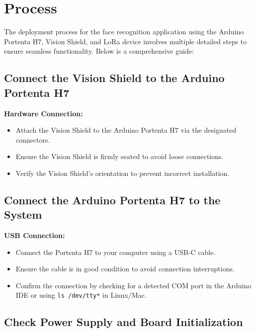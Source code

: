 \section{Process}

The deployment process for the face recognition application using the Arduino Portenta H7, Vision Shield, and LoRa device involves multiple detailed steps to ensure seamless functionality. Below is a comprehensive guide:

\subsection{Connect the Vision Shield to the Arduino Portenta H7}

\textbf{Hardware Connection:}  
\begin{itemize}[leftmargin=1.5cm]
	\item Attach the Vision Shield to the Arduino Portenta H7 via the designated connectors.
	\item Ensure the Vision Shield is firmly seated to avoid loose connections.
	\item Verify the Vision Shield’s orientation to prevent incorrect installation.
\end{itemize}

\subsection{Connect the Arduino Portenta H7 to the System}

\textbf{USB Connection:}  
\begin{itemize}[leftmargin=1.5cm]
	\item Connect the Portenta H7 to your computer using a USB-C cable.
	\item Ensure the cable is in good condition to avoid connection interruptions.
	\item Confirm the connection by checking for a detected COM port in the Arduino IDE or using \texttt{ls /dev/tty*} in Linux/Mac.
\end{itemize}

\subsection{Check Power Supply and Board Initialization}

